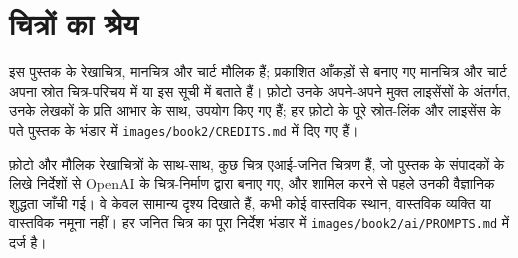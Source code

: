 \chapter*{चित्रों का श्रेय}

इस पुस्तक के रेखाचित्र, मानचित्र और चार्ट मौलिक हैं; प्रकाशित आँकड़ों से बनाए गए मानचित्र और
चार्ट अपना स्रोत चित्र-परिचय में या इस सूची में बताते हैं। फ़ोटो उनके अपने-अपने मुक्त लाइसेंसों के
अंतर्गत, उनके लेखकों के प्रति आभार के साथ, उपयोग किए गए हैं; हर फ़ोटो के पूरे स्रोत-लिंक और
लाइसेंस के पते पुस्तक के भंडार में \texttt{images/book2/CREDITS.md} में दिए गए हैं।

\bigskip
फ़ोटो और मौलिक रेखाचित्रों के साथ-साथ, कुछ चित्र एआई-जनित चित्रण हैं, जो पुस्तक के
संपादकों के लिखे निर्देशों से OpenAI के चित्र-निर्माण द्वारा बनाए गए, और शामिल करने से पहले उनकी
वैज्ञानिक शुद्धता जाँची गई। वे केवल सामान्य दृश्य दिखाते हैं, कभी कोई वास्तविक स्थान, वास्तविक व्यक्ति
या वास्तविक नमूना नहीं। हर जनित चित्र का पूरा निर्देश भंडार में
\texttt{images/book2/ai/PROMPTS.md} में दर्ज है।

